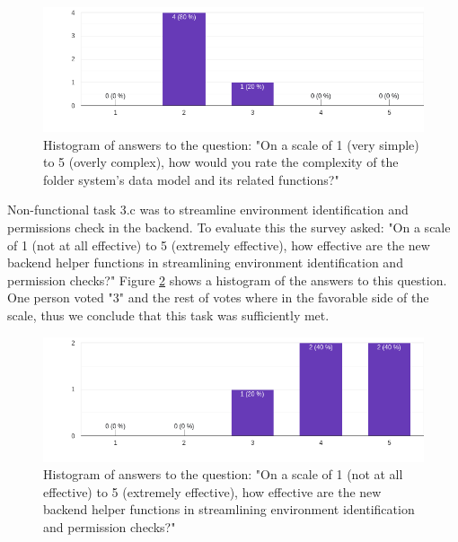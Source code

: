 \begin{figure}[h]
	\centering
  \includegraphics[scale=0.55]{../../figures/survey/3.2-folder-structures.png}
	\caption{Histogram of answers to the question: "On a scale of 1 (very simple) to 5 (overly complex), how would you rate the
complexity of the folder system’s data model and its related functions?"}
	\label{fig:evaluation:non-functional:3.2}
\end{figure}


Non-functional task 3.c was to streamline environment identification and permissions check in the backend.
To evaluate this the survey asked: 
"On a scale of 1 (not at all effective) to 5 (extremely effective), how effective are the
new backend helper functions in streamlining environment identification and permission
checks?"
Figure \ref{fig:evaluation:non-functional:3.3} shows a histogram of the answers to this question.
One person voted "3" and the rest of votes where in the favorable side of the scale,
thus we conclude that this task was sufficiently met.

\begin{figure}[h]
	\centering
  \includegraphics[scale=0.55]{../../figures/survey/3.3-backend-permissions.png}
	\caption{Histogram of answers to the question: "On a scale of 1 (not at all effective) to 5 (extremely effective), how effective are the
new backend helper functions in streamlining environment identification and permission checks?"}
	\label{fig:evaluation:non-functional:3.3}
\end{figure}

